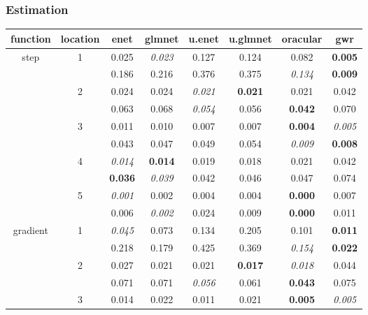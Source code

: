 \documentclass[authoryear, review, 11pt]{elsarticle}
\begin{document}
		\subsubsection{Estimation}
		\begin{table}
		\thispagestyle{empty}
		\begin{center}
\begin{tabular}{cccccccc}
 function & location & enet & glmnet & u.enet & u.glmnet & oracular & gwr \\ 
  \hline
   \multirow{10}{*}{step} & \multirow{2}{*}{1} & 0.025 & \emph{0.023} & 0.127 & 0.124 & 0.082 & \textbf{0.005} \\ 
   &  & 0.186 & 0.216 & 0.376 & 0.375 & \emph{0.134} & \textbf{0.009} \\ 
   \cline{3-8}
   & \multirow{2}{*}{2} & 0.024 & 0.024 & \emph{0.021} & \textbf{0.021} & 0.021 & 0.042 \\ 
   &  & 0.063 & 0.068 & \emph{0.054} & 0.056 & \textbf{0.042} & 0.070 \\ 
   \cline{3-8}
   & \multirow{2}{*}{3} & 0.011 & 0.010 & 0.007 & 0.007 & \textbf{0.004} & \emph{0.005} \\ 
   &  & 0.043 & 0.047 & 0.049 & 0.054 & \emph{0.009} & \textbf{0.008} \\ 
   \cline{3-8}
   & \multirow{2}{*}{4} & \emph{0.014} & \textbf{0.014} & 0.019 & 0.018 & 0.021 & 0.042 \\ 
   &  & \textbf{0.036} & \emph{0.039} & 0.042 & 0.046 & 0.047 & 0.074 \\ 
   \cline{3-8}
   & \multirow{2}{*}{5} & \emph{0.001} & 0.002 & 0.004 & 0.004 & \textbf{0.000} & 0.007 \\ 
   &  & 0.006 & \emph{0.002} & 0.024 & 0.009 & \textbf{0.000} & 0.011 \\ 
   \hline
   \multirow{10}{*}{gradient} & \multirow{2}{*}{1} & \emph{0.045} & 0.073 & 0.134 & 0.205 & 0.101 & \textbf{0.011} \\ 
   &  & 0.218 & 0.179 & 0.425 & 0.369 & \emph{0.154} & \textbf{0.022} \\ 
   \cline{3-8}
   & \multirow{2}{*}{2} & 0.027 & 0.021 & 0.021 & \textbf{0.017} & \emph{0.018} & 0.044 \\ 
   &  & 0.071 & 0.071 & \emph{0.056} & 0.061 & \textbf{0.043} & 0.075 \\ 
   \cline{3-8}
   & \multirow{2}{*}{3} &  0.014 & 0.022 & 0.011 & 0.021 & \textbf{0.005} & \emph{0.005} \\ 

\end{tabular}
\end{center}
\end{table}
\end{document}
